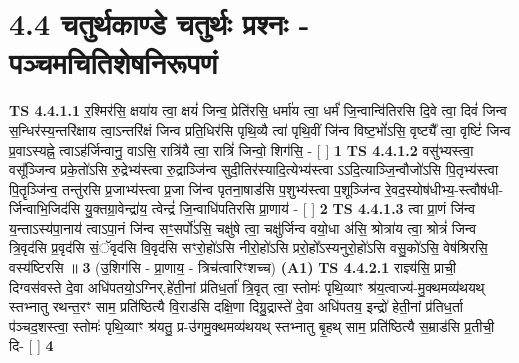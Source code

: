 \documentclass[17pt]{extarticle}
\begin{document}
     \section*{ 4.4      चतुर्थकाण्डे चतुर्थः प्रश्नः - पञ्चमचितिशेषनिरूपणं }
                                        \textbf{ TS 4.4.1.1} \newline
                  र॒श्मिर॑सि॒ क्षया॑य त्वा॒ क्षयं॑ जिन्व॒ प्रेति॑रसि॒ धर्मा॑य त्वा॒ धर्मं॑ जि॒न्वान्वि॑तिरसि दि॒वे त्वा॒ दिवं॑ जिन्व स॒न्धिर॑स्य॒न्तरि॑क्षाय त्वा॒ऽन्तरि॑क्षं जिन्व प्रति॒धिर॑सि पृथि॒व्यै त्वा॑ पृथि॒वीं जि॑न्व विष्ट॒भों॑ऽसि॒ वृष्ट्यै᳚ त्वा॒ वृष्टिं॑ जिन्व प्र॒वाऽस्यह्ने॒ त्वाऽह॑र्जिन्वानु॒ वाऽसि॒ रात्रि॑यै त्वा॒ रात्रिं॑ जिन्वो॒ शिग॑सि॒ - [  ] \textbf{  1} \newline
                  \newline
                                \textbf{ TS 4.4.1.2} \newline
                  वसु॑भ्यस्त्वा॒ वसू᳚ञ्जिन्व प्रके॒तो॑ऽसि रु॒द्रेभ्य॑स्त्वा रु॒द्राञ्जि॑न्व सुदी॒तिर॑स्यादि॒त्येभ्य॑स्त्वा ऽऽदि॒त्याञ्जि॒न्वौजो॑ऽसि पि॒तृभ्य॑स्त्वा पि॒तॄञ्जि॑न्व॒ तन्तु॑रसि प्र॒जाभ्य॑स्त्वा प्र॒जा जि॑न्व पृतना॒षाड॑सि प॒शुभ्य॑स्त्वा प॒शूञ्जि॑न्व रे॒वद॒स्योष॑धीभ्य॒-स्त्वौष॑धी-र्जिन्वाभि॒जिद॑सि यु॒क्तग्रा॒वेन्द्रा॑य॒ त्वेन्द्रं॑ जि॒न्वाधि॑पतिरसि प्रा॒णाय॑ - [  ] \textbf{  2} \newline
                  \newline
                                \textbf{ TS 4.4.1.3} \newline
                  त्वा प्रा॒णं जि॑न्व य॒न्ताऽस्य॑पा॒नाय॑ त्वाऽपा॒नं जि॑न्व सꣳ॒॒सर्पो॑ऽसि॒ चक्षु॑षे त्वा॒ चक्षु॑र्जिन्व वयो॒धा अ॑सि॒ श्रोत्रा॑य त्वा॒ श्रोत्रं॑ जिन्व त्रि॒वृद॑सि प्र॒वृद॑सि सं॒ॅवृद॑सि वि॒वृद॑सि सꣳरो॒हो॑ऽसि नीरो॒हो॑ऽसि प्ररो॒हो᳚ऽस्यनुरो॒हो॑ऽसि वसु॒को॑ऽसि॒ वेष॑श्रिरसि॒ वस्य॑ष्टिरसि ॥ \textbf{  3} \newline
                  \newline
                      (उ॒शिग॑सि - प्रा॒णाय॒ - त्रिच॑त्वारिꣳशच्च)  \textbf{(A1)} \newline \newline
                                        \textbf{ TS 4.4.2.1} \newline
                  राज्ञ्य॑सि॒ प्राची॒ दिग्वस॑वस्ते दे॒वा अधि॑पतयो॒ऽग्निर्.हे॑ती॒नां प्र॑तिध॒र्ता॑ त्रि॒वृत् त्वा॒ स्तोमः॑ पृथि॒व्याꣳ श्र॑य॒त्वाज्य॑-मु॒क्थमव्य॑थयथ् स्तभ्नातु रथन्त॒रꣳ साम॒ प्रति॑ष्ठित्यै वि॒राड॑सि दक्षि॒णा दिग्रु॒द्रास्ते॑ दे॒वा अधि॑पतय॒ इन्द्रो॑ हेती॒नां प्र॑तिध॒र्ता प॑ञ्चद॒शस्त्वा॒ स्तोमः॑ पृथि॒व्याꣳ श्र॑यतु॒ प्र-उ॑गमु॒क्थमव्य॑थयथ् स्तभ्नातु बृ॒हथ् साम॒ प्रति॑ष्ठित्यै स॒म्राड॑सि प्र॒तीची॒ दि- [  ] \textbf{  4} \newline
\end{document}
